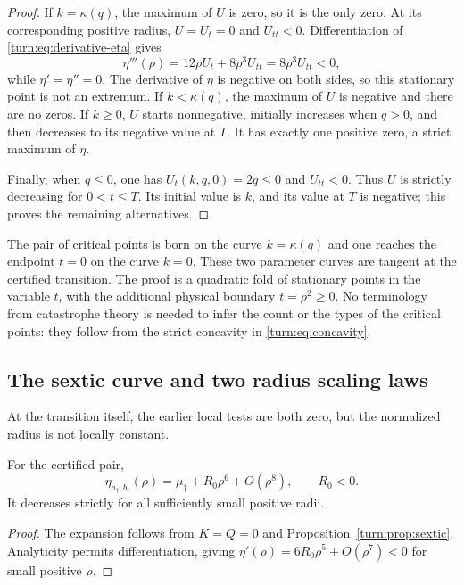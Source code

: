 \begin{proof}
If $k=\kappa(q)$, the maximum of $U$ is zero, so it is the only zero.
At its corresponding positive radius, $U=U_t=0$ and $U_{tt}<0$.
Differentiation of \eqref{turn:eq:derivative-eta} gives
\[
 \eta'''(\rho)=12\rho U_t+8\rho^3U_{tt}
             =8\rho^3U_{tt}<0,
\]
while $\eta'=\eta''=0$.  The derivative of $\eta$ is negative on
both sides, so this stationary point is not an extremum.  If
$k<\kappa(q)$, the maximum of $U$ is negative and there are no zeros.
If $k\ge0$, $U$ starts nonnegative, initially increases when $q>0$,
and then decreases to its negative value at $T$.  It has exactly one
positive zero, a strict maximum of $\eta$.

Finally, when $q\le0$, one has $U_t(k,q,0)=2q\le0$ and
$U_{tt}<0$.  Thus $U$ is strictly decreasing for $0<t\le T$.
Its initial value is $k$, and its value at $T$ is negative; this proves
the remaining alternatives.
\end{proof}

The pair of critical points is born on the curve $k=\kappa(q)$ and
one reaches the endpoint $t=0$ on the curve $k=0$.  These two parameter
curves are tangent at the certified transition.  The proof is a
quadratic fold of stationary points in the variable $t$, with the
additional physical boundary $t=\rho^2\ge0$.  No terminology from
catastrophe theory is needed to infer the count or the types of the
critical points: they follow from the strict concavity in
\eqref{turn:eq:concavity}.

\subsection{The sextic curve and two radius scaling laws}
\label{turn:sec:scaling}

At the transition itself, the earlier local tests are both zero, but
the normalized radius is not locally constant.

\begin{corollary}
\label{turn:cor:sextic}
For the certified pair,
\begin{equation}
 \eta_{a_\dagger,b_\dagger}(\rho)
 =\mu_\dagger+R_0\rho^6+O(\rho^8),\qquad R_0<0.
 \label{turn:eq:at-transition}
\end{equation}
It decreases strictly for all sufficiently small positive radii.
\end{corollary}

\begin{proof}
The expansion follows from $K=Q=0$ and
Proposition~\ref{turn:prop:sextic}.  Analyticity permits
differentiation, giving
$\eta'(\rho)=6R_0\rho^5+O(\rho^7)<0$ for small positive $\rho$.
\end{proof}

